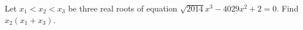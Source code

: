 Let $x_1<x_2<x_3$ be three real roots of equation $\sqrt{2014}x^3-4029x^2+2=0$. Find $x_2(x_1+x_3)$.